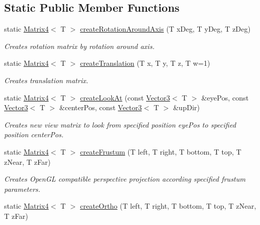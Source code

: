 \subsection*{Static Public Member Functions}
\begin{DoxyCompactItemize}
\item 
static \hyperlink{class_matrix4}{Matrix4}$<$ T $>$ \hyperlink{class_matrix4_a55c7865b25c33d0b02835a8ac8d32db8}{createRotationAroundAxis} (T xDeg, T yDeg, T zDeg)
\begin{DoxyCompactList}\small\item\em Creates rotation matrix by rotation around axis. \item\end{DoxyCompactList}\item 
static \hyperlink{class_matrix4}{Matrix4}$<$ T $>$ \hyperlink{class_matrix4_a7b68a758485c1f5b8239ed7632658519}{createTranslation} (T x, T y, T z, T w=1)
\begin{DoxyCompactList}\small\item\em Creates translation matrix. \item\end{DoxyCompactList}\item 
static \hyperlink{class_matrix4}{Matrix4}$<$ T $>$ \hyperlink{class_matrix4_a0b8035f3d1144444d6835cd60642009d}{createLookAt} (const \hyperlink{class_vector3}{Vector3}$<$ T $>$ \&eyePos, const \hyperlink{class_vector3}{Vector3}$<$ T $>$ \&centerPos, const \hyperlink{class_vector3}{Vector3}$<$ T $>$ \&upDir)
\begin{DoxyCompactList}\small\item\em Creates new view matrix to look from specified position {\itshape eyePos\/} to specified position {\itshape centerPos\/}. \item\end{DoxyCompactList}\item 
static \hyperlink{class_matrix4}{Matrix4}$<$ T $>$ \hyperlink{class_matrix4_a3874c4332bb5f89a03eac10641ad9f06}{createFrustum} (T left, T right, T bottom, T top, T zNear, T zFar)
\begin{DoxyCompactList}\small\item\em Creates OpenGL compatible perspective projection according specified frustum parameters. \item\end{DoxyCompactList}\item 
static \hyperlink{class_matrix4}{Matrix4}$<$ T $>$ \hyperlink{class_matrix4_af678671e87d2fafd79fe8b00344f2229}{createOrtho} (T left, T right, T bottom, T top, T zNear, T zFar)

\end{DoxyCompactItemize}
